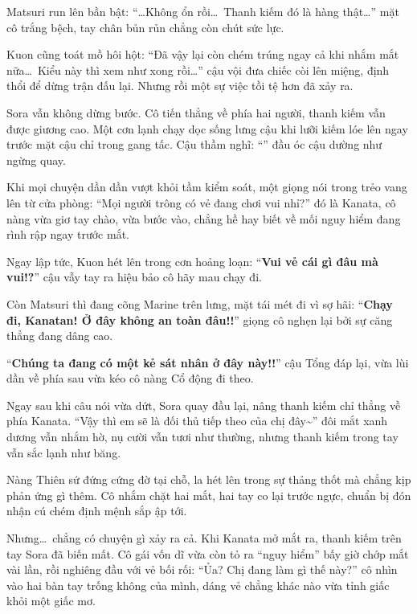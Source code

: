 \documentclass[../main.tex]{subfiles}
\begin{document}
Matsuri run lên bần bật: ``\dots Không ổn rồi\dots\ Thanh kiếm đó là hàng thật\dots'' mặt cô trắng bệch, tay chân bủn rủn chẳng còn chút sức lực.

Kuon cũng toát mồ hôi hột: ``Đã vậy lại còn chém trúng ngay cả khi nhắm mắt nữa\dots\ Kiểu này thì xem như xong rồi\dots'' cậu vội đưa chiếc còi lên miệng, định thổi để dừng trận đấu lại. Nhưng rồi một sự việc tồi tệ hơn đã xảy ra.

Sora vẫn không dừng bước. Cô tiến thẳng về phía hai người, thanh kiếm vẫn được giương cao. Một cơn lạnh chạy dọc sống lưng cậu khi lưỡi kiếm lóe lên ngay trước mặt cậu chỉ trong gang tấc. Cậu thầm nghĩ: ``\textit{}'' đầu óc cậu dường như ngừng quay.

Khi mọi chuyện dần dần vượt khỏi tầm kiểm soát, một giọng nói trong trẻo vang lên từ cửa phòng: ``Mọi người trông có vẻ đang chơi vui nhỉ?'' đó là Kanata, cô nàng vừa giơ tay chào, vừa bước vào, chẳng hề hay biết về mối nguy hiểm đang rình rập ngay trước mắt.

Ngay lập tức, Kuon hét lên trong cơn hoảng loạn: ``\textbf{Vui vẻ cái gì đâu mà vui!?}'' cậu vẫy tay ra hiệu bảo cô hãy mau chạy đi.

Còn Matsuri thì đang cõng Marine trên lưng, mặt tái mét đi vì sợ hãi: ``\textbf{Chạy đi, Kanatan! Ở đây không an toàn đâu!!}'' giọng cô nghẹn lại bởi sự căng thẳng đang dâng cao.

``\textbf{Chúng ta đang có một kẻ sát nhân ở đây này!!}'' cậu Tổng đáp lại, vừa lùi dần về phía sau vừa kéo cô nàng Cổ động đi theo.

Ngay sau khi câu nói vừa dứt, Sora quay đầu lại, nâng thanh kiếm chỉ thẳng về phía Kanata. ``Vậy thì em sẽ là đối thủ tiếp theo của chị đây\~{}'' đôi mắt xanh dương vẫn nhắm hờ, nụ cười vẫn tươi như thường, nhưng thanh kiếm trong tay vẫn sắc lạnh như băng.

Nàng Thiên sứ đứng cứng đờ tại chỗ, la hét lên trong sự thảng thốt mà chẳng kịp phản ứng gì thêm. Cô nhắm chặt hai mắt, hai tay co lại trước ngực, chuẩn bị đón nhận cú chém định mệnh sắp ập tới.


Nhưng\dots\ chẳng có chuyện gì xảy ra cả. Khi Kanata mở mắt ra, thanh kiếm trên tay Sora đã biến mất. Cô gái vốn dĩ vừa còn tỏ ra ``nguy hiểm'' bấy giờ chớp mắt vài lần, rồi nghiêng đầu với vẻ bối rối: ``Ủa? Chị đang làm gì thế này?'' cô nhìn vào hai bàn tay trống không của mình, dáng vẻ chẳng khác nào vừa tỉnh giấc khỏi một giấc mơ.
\end{document}
